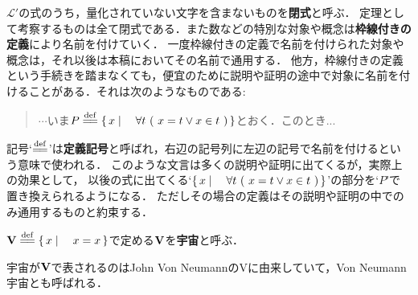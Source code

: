 	$\mathcal{L}'$の式のうち，量化されていない文字を含まないものを{\bf 閉式}と呼ぶ．
	定理として考察するものは全て閉式である．また数などの特別な対象や概念は{\bf 枠線付きの定義}により名前を付けていく．
	一度枠線付きの定義で名前を付けられた対象や概念は，それ以後は本稿においてその名前で通用する．
	他方，枠線付きの定義という手続きを踏まなくても，便宜のために説明や証明の途中で対象に名前を付けることがある．それは次のようなものである: 
	\begin{quote}
		$\cdots$いま$P \defeq \Set{x}{\forall t\ (\ x = t \vee x \in t\ )}$とおく．このとき...
	\end{quote}
	記号`$\defeq$'は{\bf 定義記号}と呼ばれ，右辺の記号列に左辺の記号で名前を付けるという意味で使われる．
	このような文言は多くの説明や証明に出てくるが，実際上の効果として，
	以後の式に出てくる`$\Set{x}{\forall t\ (\ x = t \vee x \in t\ )}$'の部分を`$P$'で置き換えられるようになる．
	ただしその場合の定義はその説明や証明の中でのみ通用するものと約束する．
	
	\begin{screen}
		\begin{dfn}[宇宙]
			$\Univ \defeq \Set{x}{x=x}$で定める$\mathbf{V}$を{\bf 宇宙}と呼ぶ．
		\end{dfn}
	\end{screen}
	
	宇宙が$\mathbf{V}$で表されるのはJohn Von NeumannのVに由来していて，Von Neumann 宇宙とも呼ばれる．
	
	
